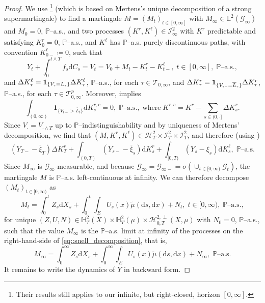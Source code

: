 \documentclass[10pt]{article} %
\newcommand\cG{\mathcal G}
\newcommand\cH{\mathcal H}
\newcommand\cI{\mathcal I}
\newcommand\cT{\mathcal T}
\newcommand{\smalltext}[1]{\text{\fontsize{4}{4}\selectfont$#1$}}
\def \H{\mathbb{H}}
\def \L{\mathbb{L}}
\def \P{\mathbb{P}}
\def\d{\mathrm{d}}
\begin{document}
\begin{proof}
	We use \cite[Lemma 3.2]{grigorova2020optimal}\footnote{Their results still applies to our infinite, but right-closed, horizon $[0,\infty]$.} (which is based on Mertens's unique decomposition of a strong supermartingale)  to find a martingale $M = (M_t)_{t \in [0,\infty]}$ with $M_\infty \in \L^2(\cG_\infty)$ and $M_0 = 0$, $\P$--a.s., and two processes $(K^r,K^\ell) \in \cI^2_\infty$ with $K^r$ predictable and satisfying $K^r_0 = 0$, $\P$--a.s., and $K^\ell$ has $\P$--a.s. purely discontinuous paths, with convention $K^\ell_{0-} \coloneqq 0$, such that
	\begin{equation*}
		Y_t + \int_0^{t \land T} f_s \d C_s = V_t = V_0  + M_t - K^r_t - K^\ell_{t-}, \; t \in [0,\infty], \; \text{$\P$--a.s.},
	\end{equation*}
	and $\Delta K^\ell_\tau = \mathbf{1}_{\{V_\smalltext{\tau} = L_\smalltext{\tau}\}} \Delta K^\ell_\tau$, $\P$--a.s., for each $\tau \in \cT_{0,\infty}$, and $\Delta K^r_\tau = \mathbf{1}_{\{V_{\smalltext{\tau}\smalltext{-}} = \overline L_\smalltext{\tau}\}} \Delta K^r_\tau$, $\P$--a.s., for each $\tau \in \cT^p_{0,\infty}$. Moreover, \cite[Lemma 3.3]{grigorova2020optimal} implies
	\begin{equation*}
		\int_{(0,\infty)} \mathbf{1}_{\{V_{t-} > \overline L_t\}} \d K^{r,c}_s = 0, \; \text{$\P$--a.s.}, \; \text{where} \; K^{r,c} = K^r - \sum_{s \in (0,\cdot]} \Delta K^r_s.
	\end{equation*}
	Since $V_\cdot = V_{\cdot \land T}$ up to $\P$--indistinguishability and by uniqueness of Mertens' decomposition, we find that $(M,K^r,K^\ell) \in \cH^2_T \times \cI^2_T \times \cI^2_T$, and therefore (using )
	\begin{equation*}
		(Y_{T-} - \overline\xi_T)\Delta K^r_T + \int_{(0,T)} (Y_{s-} - \overline\xi_s) \d K^r_s + \int_{[0,T)} (Y_s - \xi_s) \d K^\ell_s, \; \text{$\P$--a.s.}
	\end{equation*}
	Since $M_\infty$ is $\cG_\infty$-measurable, and because $\cG_\infty = \cG_{\infty-} = \sigma(\cup_{t \in [0,\infty)}\cG_t)$, the martingale $M$ is $\P$--a.s. left-continuous at infinity. We can therefore decompose $(M_t)_{t \in [0,\infty)}$ as
	\begin{equation}\label{eq::snell_decomposition}
		M_t = \int_0^t Z_s \d X_s + \int_0^t\int_E U_s(x)\tilde\mu(\d s, \d x) + N_t, \; t \in [0,\infty), \; \text{$\P$--a.s.},
	\end{equation}
	for unique $(Z,U,N) \in \H^2_T(X) \times \H^2_T(\mu) \times \cH^{2,\perp}_{0,T}(X,\mu)$ with $N_0 = 0$, $\P$--a.s., such that the value $M_\infty$ is the $\P$--a.s. limit at infinity of the processes on the right-hand-side of \eqref{eq::snell_decomposition}, that is,
	\begin{equation*}
		M_\infty = \int_0^{\infty} Z_s \d X_s + \int_0^{\infty}\int_E U_s(x)\tilde\mu(\d s, \d x) + N_\infty, \; \text{$\P$--a.s.}
	\end{equation*}
	It remains to write the dynamics of $Y$ in backward form.
	

\end{proof}
\end{document}

